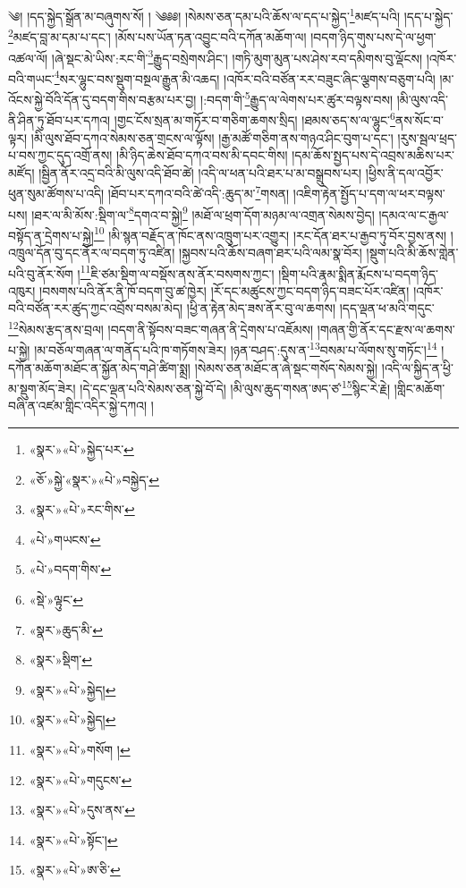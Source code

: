 ༄། །དད་སྐྱེད་སྒྲོན་མ་བཞུགས་སོ། ། ༄༅༅། །སེམས་ཅན་དམ་པའི་ཆོས་ལ་དད་པ་སྐྱེད་\footnote{«སྣར་»«པེ་»སྐྱེད་པར་}མཛད་པའི། །དད་པ་སྐྱེད་\footnote{«ཅོ་»སྐྱེ་«སྣར་»«པེ་»བསྐྱེད་}མཛད་བླ་མ་དམ་པ་དང་། །མོས་པས་ཡོན་ཏན་འབྱུང་བའི་དཀོན་མཆོག་ལ། །བདག་ཉིད་གུས་པས་དེ་ལ་ཕྱག་འཚལ་ལོ། །ཞེ་སྡང་མེ་ཡིས་:རང་གི་\footnote{«སྣར་»«པེ་»རང་གིས་}རྒྱུད་བསྲེགས་ཤིང་། །གཏི་མུག་མུན་པས་ཤེས་རབ་དམིགས་བུ་ལྡོངས། །འཁོར་བའི་གཡང་\footnote{«པེ་»གཡངས་}སར་ལྷུང་བས་སྡུག་བསྔལ་རྒྱུན་མི་འཆད། །འཁོར་བའི་བཙོན་རར་བཟུང་ཞིང་ལྕགས་བཅུག་པའི། །མ་འོངས་སྐྱེ་བོའི་དོན་དུ་བདག་གིས་བརྩམ་པར་བྱ། །:བདག་གི་\footnote{«པེ་»བདག་གིས་}རྒྱུད་ལ་ལེགས་པར་ཚུར་བལྟས་བས། །མི་ལུས་འདི་ནི་ཤིན་ཏུ་ཐོབ་པར་དཀའ། །གྱང་ངོས་སྲན་མ་གཏོར་བ་གཅིག་ཆགས་སྲིད། །ཐམས་ཅད་ས་ལ་ལྷུང་\footnote{«སྡེ་»ལྟུང་}ནས་སོང་བ་ལྟར། །མི་ལུས་ཐོབ་དཀའ་སེམས་ཅན་གྲངས་ལ་ལྟོས། །རྒྱ་མཚོ་གཅིག་ནས་གཉའ་ཤིང་བུག་པ་དང་། །རུས་སྦལ་ཕྲད་པ་བས་ཀྱང་དུད་འགྲོ་ནས། །མི་ཉིད་ཆེས་ཐོབ་དཀའ་བས་མི་དབང་གིས། །དམ་ཆོས་སྤྱད་པས་དེ་འབྲས་མཆིས་པར་མཛོད། །སྦྱིན་ནོར་འདྲ་བའི་མི་ལུས་འདི་ཐོབ་ཚེ། །འདི་ལ་ཕན་པའི་ཐར་པ་མ་བསྒྲུབས་པར། །ཕྱིས་ནི་དལ་འབྱོར་ཕུན་སུམ་ཚོགས་པ་འདི། །ཐོབ་པར་དཀའ་བའི་ཚེ་འདི་:ཆུད་མ་\footnote{«སྣར་»ཆུད་མི་}གསན། །འཇིག་རྟེན་སྤྱོད་པ་དག་ལ་ཕར་བལྟས་པས། །ཐར་ལ་མི་མོས་:སྡིག་ལ་\footnote{«སྣར་»སྡིག་}དགའ་བ་སྐྱེ།\footnote{«སྣར་»«པེ་»སྐྱེད།} །མཐོ་ལ་ཕྲག་དོག་མཉམ་ལ་འགྲན་སེམས་བྱེད། །དམའ་ལ་ང་རྒྱལ་བསྟོད་ན་དྲེགས་པ་སྐྱེ།\footnote{«སྣར་»«པེ་»སྐྱེད།} །མི་སྙན་བརྗོད་ན་ཁོང་ནས་འཁྲུག་པར་འགྱུར། །རང་དོན་ཐར་པ་རྒྱབ་ཏུ་བོར་བྱས་ནས། །འཁྲུལ་དོན་བུ་དང་ནོར་ལ་བདག་ཏུ་འཛིན། །སྐྱབས་པའི་ཆོས་བཞག་ཐར་པའི་ལམ་སྣ་བོར། །སྡུག་པའི་མི་ཆོས་གླེན་པའི་བུ་ནོར་སོག །\footnote{«སྣར་»«པེ་»གསོག །}ཇི་ཙམ་སྡིག་ལ་བསྡོས་ནས་ནོར་བསགས་ཀྱང་། །སྡིག་པའི་རྣམ་སྨིན་རྨོངས་པ་བདག་ཉིད་འཁུར། །བསགས་པའི་ནོར་ནི་ཁོ་བདག་བུ་ཚ་ཁྱེར། །རོ་དང་མཚུངས་ཀྱང་བདག་ཉིད་བཟང་པོར་འཛིན། །འཁོར་བའི་བཙོན་རར་ཚུད་ཀྱང་འབྲོས་བསམ་མེད། །ཕྱི་ན་རྟེན་མེད་ཟས་ནོར་བུ་ལ་ཆགས། །དད་ལྡན་ཕ་མའི་གདུང་\footnote{«སྣར་»«པེ་»གདུངས་}སེམས་རྩད་ནས་བྲལ། །བདག་ནི་སྟོབས་བཟང་གཞན་ནི་དྲེགས་པ་འཇོམས། །གཞན་གྱི་ནོར་དང་རྫས་ལ་ཆགས་པ་སྐྱེ། །མ་བཅོལ་གཞན་ལ་གནོད་པའི་ཁ་གཏོགས་ཟེར། །ཉན་བཤད་:དུས་ན་\footnote{«སྣར་»«པེ་»དུས་ནས་}བསམ་པ་ལོགས་སུ་གཏོང་།\footnote{«སྣར་»«པེ་»སྟོང་།} །དཀོན་མཆོག་མཐོང་ན་སྐྱོན་མེད་གཤེ་ཚིག་སྨྲ། །སེམས་ཅན་མཐོང་ན་ཞེ་སྡང་གསོད་སེམས་སྐྱེ། །འདི་ལ་སྐྱིད་ན་ཕྱི་མ་སྡུག་མོད་ཟེར། །དེ་དང་ལྡན་པའི་སེམས་ཅན་སྐྱེ་བོ་དེ། །མི་ལུས་ཆུད་གསན་ཨད་ཙ་\footnote{«སྣར་»«པེ་»ཨ་ཅི་}སྙིང་རེ་རྗེ། །གླིང་མཆོག་བཞི་ན་འཛམ་གླིང་འདིར་སྐྱེ་དཀའ། །
